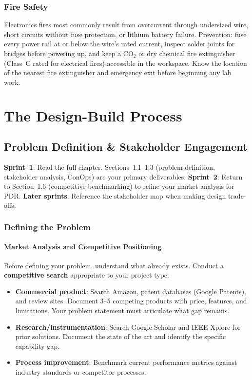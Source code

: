 \documentclass[11pt,letterpaper,twoside,openany]{book}
\begin{document}
\section*{Fire Safety}
Electronics fires most commonly result from overcurrent through undersized wire, short circuits without fuse protection, or lithium battery failure. Prevention: fuse every power rail at or below the wire's rated current, inspect solder joints for bridges before powering up, and keep a CO$_2$ or dry chemical fire extinguisher (Class~C rated for electrical fires) accessible in the workspace. Know the location of the nearest fire extinguisher and emergency exit before beginning any lab work.

\mainmatter


\part{The Design-Build Process}

\chapter{Problem Definition \& Stakeholder Engagement}\label{ch:problem}

\begin{tipbox}
\textbf{Sprint~1}: Read the full chapter. Sections~1.1--1.3 (problem definition, stakeholder analysis, ConOps) are your primary deliverables. \textbf{Sprint~2}: Return to Section~1.6 (competitive benchmarking) to refine your market analysis for PDR. \textbf{Later sprints}: Reference the stakeholder map when making design trade-offs.
\end{tipbox}

\vspace{1em}


\vspace{1em}

\section{Defining the Problem}
\subsection{Market Analysis and Competitive Positioning}
Before defining your problem, understand what already exists. Conduct a \textbf{competitive search} appropriate to your project type:

\begin{itemize}[leftmargin=1.5em]
\item \textbf{Commercial product}: Search Amazon, patent databases (Google Patents), and review sites. Document 3--5 competing products with price, features, and limitations. Your problem statement must articulate what gap remains.
\item \textbf{Research/instrumentation}: Search Google Scholar and IEEE Xplore for prior solutions. Document the state of the art and identify the specific capability gap.
\item \textbf{Process improvement}: Benchmark current performance metrics against industry standards or competitor processes.
\end{itemize}
\end{document}
